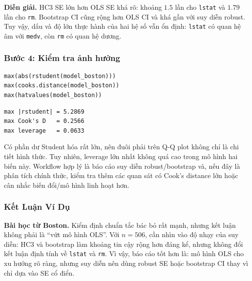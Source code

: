 \textbf{Diễn giải.} HC3 SE lớn hơn OLS SE khá rõ: khoảng $1.5$ lần cho \texttt{lstat} và $1.79$ lần cho \texttt{rm}. Bootstrap CI cũng rộng hơn OLS CI và khá gần với suy diễn robust. Tuy vậy, dấu và độ lớn thực hành của hai hệ số vẫn ổn định: \texttt{lstat} có quan hệ âm với \texttt{medv}, còn \texttt{rm} có quan hệ dương.

\subsubsection*{Bước 4: Kiểm tra ảnh hưởng}

\begin{lstlisting}[style=Rstyle]
max(abs(rstudent(model_boston)))
max(cooks.distance(model_boston))
max(hatvalues(model_boston))
\end{lstlisting}

\begin{lstlisting}[style=output]
max |rstudent| = 5.2869
max Cook's D   = 0.2566
max leverage   = 0.0633
\end{lstlisting}

Có phần dư Student hóa rất lớn, nên đuôi phải trên Q-Q plot không chỉ là chi tiết hình thức. Tuy nhiên, leverage lớn nhất không quá cao trong mô hình hai biến này. Workflow hợp lý là báo cáo suy diễn robust/bootstrap và, nếu đây là phân tích chính thức, kiểm tra thêm các quan sát có Cook's distance lớn hoặc cân nhắc biến đổi/mô hình linh hoạt hơn.

\subsubsection*{Kết Luận Ví Dụ}

\begin{notebox}
\textbf{Bài học từ Boston.} Kiểm định chuẩn tắc bác bỏ rất mạnh, nhưng kết luận không phải là ``vứt mô hình OLS''. Với $n=506$, cần nhìn vào độ nhạy của suy diễn: HC3 và bootstrap làm khoảng tin cậy rộng hơn đáng kể, nhưng không đổi kết luận định tính về \texttt{lstat} và \texttt{rm}. Vì vậy, báo cáo tốt hơn là: mô hình OLS cho xu hướng rõ ràng, nhưng suy diễn nên dùng robust SE hoặc bootstrap CI thay vì chỉ dựa vào SE cổ điển.
\end{notebox}

